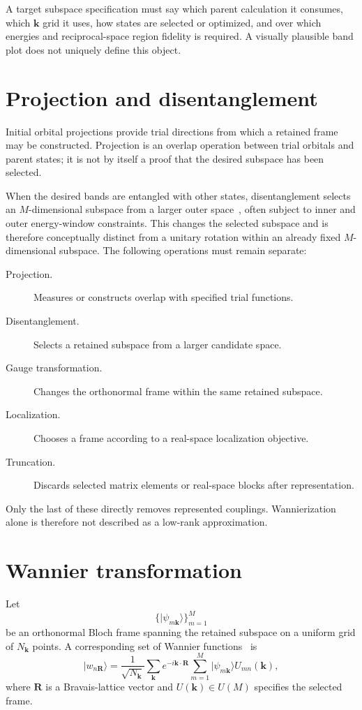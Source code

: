 A target subspace specification must say which parent calculation it consumes,
which $\mathbf k$ grid it uses, how states are selected or optimized, and over
which energies and reciprocal-space region fidelity is required. A visually
plausible band plot does not uniquely define this object.

\section{Projection and disentanglement}

Initial orbital projections provide trial directions from which a retained
frame may be constructed. Projection is an overlap operation between trial
orbitals and parent states; it is not by itself a proof that the desired
subspace has been selected.

When the desired bands are entangled with other states, disentanglement selects
an $M$-dimensional subspace from a larger outer space~\cite{souza2001}, often
subject to inner
and outer energy-window constraints. This changes the selected subspace and is
therefore conceptually distinct from a unitary rotation within an already fixed
$M$-dimensional subspace. The following operations must remain separate:

\begin{description}
  \item[Projection.] Measures or constructs overlap with specified trial
    functions.
  \item[Disentanglement.] Selects a retained subspace from a larger candidate
    space.
  \item[Gauge transformation.] Changes the orthonormal frame within the same
    retained subspace.
  \item[Localization.] Chooses a frame according to a real-space localization
    objective.
  \item[Truncation.] Discards selected matrix elements or real-space blocks
    after representation.
\end{description}

Only the last of these directly removes represented couplings. Wannierization
alone is therefore not described as a low-rank approximation.

\section{Wannier transformation}

Let
\begin{equation}
  \{\lvert\psi_{m\mathbf k}\rangle\}_{m=1}^{M}
\end{equation}
be an orthonormal Bloch frame spanning the retained subspace on a uniform grid
of $N_{\mathbf k}$ points. A corresponding set of Wannier
functions~\cite{wannier1937} is
\begin{equation}
  \lvert w_{n\mathbf R}\rangle
  =
  \frac{1}{\sqrt{N_{\mathbf k}}}
  \sum_{\mathbf k}e^{-i\mathbf k\cdot\mathbf R}
  \sum_{m=1}^{M}
  \lvert\psi_{m\mathbf k}\rangle U_{mn}(\mathbf k),
\end{equation}
where $\mathbf R$ is a Bravais-lattice vector and
$U(\mathbf k)\in U(M)$ specifies the selected frame.


